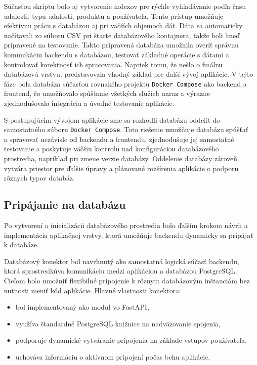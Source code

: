 \documentclass[a4paper, 12pt]{article}
\begin{document}
Súčasťou skriptu bolo aj vytvorenie indexov pre rýchle vyhľadávanie podľa času udalosti, typu udalosti, produktu a používateľa. 
Tento prístup umožňuje efektívnu prácu s databázou aj pri väčších objemoch dát. 
Dáta sa automaticky načítavali zo súboru CSV pri štarte databázového kontajnera, takže boli hneď pripravené na testovanie.
Takto pripravená databáza umožnila overiť správnu komunikáciu backendu s databázou, testovať základné operácie s dátami a kontrolovať korektnosť ich spracovania. 
Napriek tomu, že nešlo o finálnu databázovú vrstvu, predstavovala vhodný základ pre ďalší vývoj aplikácie.\clearpage
V tejto fáze bola databáza súčasťou rovnakého projektu \texttt{Docker Compose} ako backend a frontend, čo umožňovalo spúšťanie všetkých služieb naraz a výrazne zjednodušovalo integráciu a úvodné testovanie aplikácie.

S postupujúcim vývojom aplikácie sme sa rozhodli databázu oddeliť do samostatného súboru \texttt{Docker Compose}. 
Toto riešenie umožňuje databázu spúšťať a spravovať nezávisle od backendu a frontendu, zjednodušuje jej samostatné testovanie a poskytuje väčšiu kontrolu nad konfiguráciou databázového prostredia, napríklad pri zmene verzie databázy. 
Oddelenie databázy zároveň vytvára priestor pre ďalšie úpravy a plánované rozšírenia aplikácie o podporu rôznych typov databáz.

\subsection{Pripájanie na databázu}

Po vytvorení a inicializácii databázového prostredia bolo ďalším krokom návrh a implementácia aplikačnej vrstvy, ktorá umožňuje backendu dynamicky sa pripájať k databáze.

Databázový konektor bol navrhnutý ako samostatná logická súčasť backendu, ktorá sprostredkúva komunikáciu medzi aplikáciou a databázou PostgreSQL. 
Cieľom bolo umožniť flexibilné pripojenie k rôznym databázovým inštanciám bez nutnosti meniť kód aplikácie.
Hlavné vlastnosti konektora:

\begin{itemize}
    \item bol implementovaný ako modul vo FastAPI,
    \item využíva štandardné PostgreSQL knižnice na nadväzovanie spojenia,
    \item podporuje dynamické vytváranie pripojenia na základe vstupov používateľa,
    \item uchováva informáciu o aktívnom pripojení počas behu aplikácie.
\end{itemize}
\end{document}
